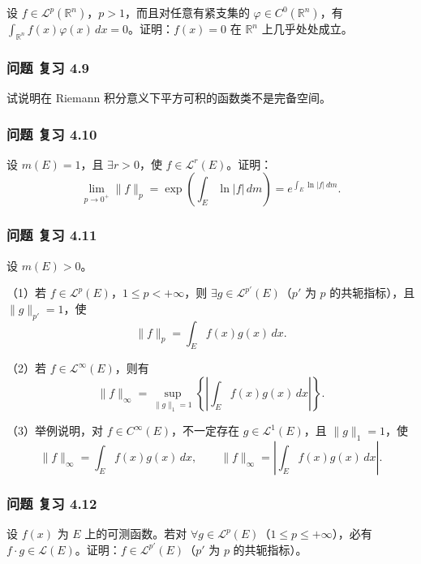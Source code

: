\documentclass[11pt,a4paper]{article}
\begin{document}
设 \(f\in\mathcal L^p(\mathbb R^n)\)，\(p>1\)，而且对任意有紧支集的
\(\varphi\in C^0(\mathbb R^n)\)，有
\(\int_{\mathbb R^n}f(x)\varphi(x)\,dx=0\)。证明：\(f(x)=0\) 在
\(\mathbb R^n\) 上几乎处处成立。

\subsubsection{问题 复习 4.9}\label{ch04-practice-ux95eeux9898-ux590dux4e60-4.9}

试说明在 Riemann 积分意义下平方可积的函数类不是完备空间。

\subsubsection{问题 复习 4.10}\label{ch04-practice-ux95eeux9898-ux590dux4e60-4.10}

设 \(m(E)=1\)，且 \(\exists r>0\)，使 \(f\in\mathcal L^r(E)\)。证明： \[
\lim_{p\to0^+}\|f\|_p
=\exp\left(\int_E\ln|f|\,dm\right)
=e^{\int_E\ln|f|\,dm}.
\]

\subsubsection{问题 复习 4.11}\label{ch04-practice-ux95eeux9898-ux590dux4e60-4.11}

设 \(m(E)>0\)。

（1）若 \(f\in\mathcal L^p(E)\)，\(1\le p<+\infty\)，则
\(\exists g\in\mathcal L^{p'}(E)\)（\(p'\) 为 \(p\) 的共轭指标），且
\(\|g\|_{p'}=1\)，使 \[
\|f\|_p=\int_Ef(x)g(x)\,dx.
\]

（2）若 \(f\in\mathcal L^\infty(E)\)，则有 \[
\|f\|_\infty=\sup_{\|g\|_1=1}\left\{\left|\int_Ef(x)g(x)\,dx\right|\right\}.
\]

（3）举例说明，对 \(f\in C^\infty(E)\)，不一定存在
\(g\in\mathcal L^1(E)\)，且 \(\|g\|_1=1\)，使 \[
\|f\|_\infty=\int_Ef(x)g(x)\,dx,\qquad
\|f\|_\infty=\left|\int_Ef(x)g(x)\,dx\right|.
\]

\subsubsection{问题 复习 4.12}\label{ch04-practice-ux95eeux9898-ux590dux4e60-4.12}

设 \(f(x)\) 为 \(E\) 上的可测函数。若对
\(\forall g\in\mathcal L^p(E)\)（\(1\le p\le+\infty\)），必有
\(f\cdot g\in\mathcal L(E)\)。证明：\(f\in\mathcal L^{p'}(E)\)（\(p'\)
为 \(p\) 的共轭指标）。
\end{document}
